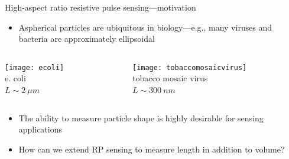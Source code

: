 \begin{frame}[c]{High-aspect ratio resistive pulse sensing---motivation}
 	\begin{itemize}
 		\item Aspherical particles are ubiquitous in biology---e.g., many viruses and bacteria are approximately ellipsoidal
 	\end{itemize}


	\begin{columns}[t]
		\begin{column}[T]{2.5in}
			{\centering
				\texttt{[image: ecoli]} \\
				e. coli \\
				$L\sim \SI{2}{\mu m}$ \\
				\par
			}
		\end{column}
		
		
		\begin{column}[T]{2.5in}
			{\centering
				\texttt{[image: tobaccomosaicvirus]} \\
				tobacco mosaic virus \\
				$L\sim \SI{300}{nm}$ \\
				\par
			}
		\end{column}
	

	\end{columns}

	\begin{itemize}
		\item The ability to measure particle shape is highly desirable for sensing applications
 		\item How can we extend RP sensing to measure length in addition to volume?
 	\end{itemize}
	

\end{frame}





